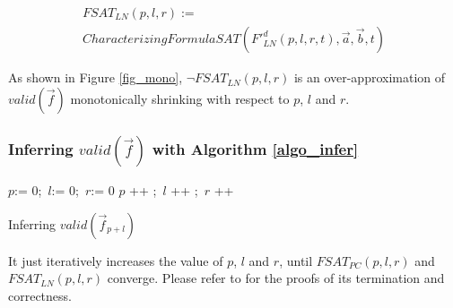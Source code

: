 \documentclass[conference]{IEEEtran}
\begin{document}
\begin{multline}\label{fsat_ln}
FSAT_{LN}(p,l,r):=\\
CharacterizingFormulaSAT(F'^d_{LN}(p,l,r,t),\vec{a},\vec{b},t)
\end{multline}

As shown in Figure \ref{fig_mono},
% 
$\neg FSAT_{LN}(p,l,r)$ is an over-approximation of $valid(\vec{f})$ monotonically shrinking with respect to
$p$, $l$ and $r$.




\subsubsection{Inferring $valid(\vec{f})$ with Algorithm \ref{algo_infer}}\label{subsub_overal}
\begin{algorithm}[t]
\SetAlgoVlined
$p$:= $0$;~$l$:= $0$;~$r$:= $0$ \;
 {
  $p$ ++ ;~$l$ ++ ;~$r$ ++ \;
}
\caption{Inferring $valid(\vec{f}_{p+l})$}
\label{algo_infer}
\end{algorithm}

It just iteratively increases the value of $p$, $l$ and $r$, 
until $FSAT_{PC}(p,l,r)$ and $FSAT_{LN}(p,l,r)$ converge.
Please refer to \cite{QinTODAES15} for the proofs of its termination and correctness.
\end{document}
